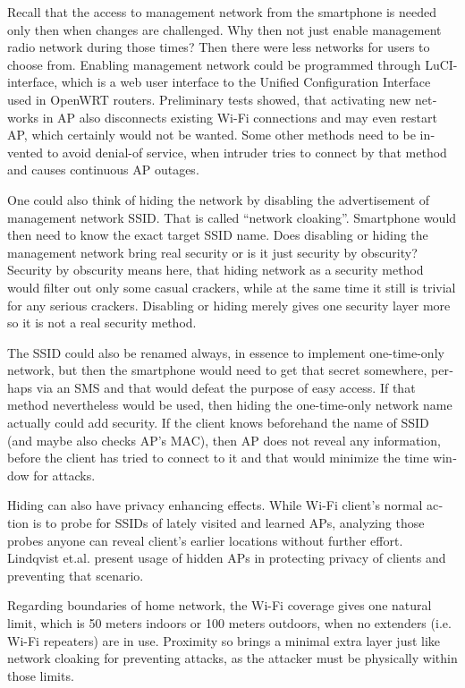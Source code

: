 \documentclass[12pt,a4paper,english]{tutthesis}
\begin{document}
\begin{otherlanguage}{english}
{Recall that the access to management network from the smartphone is
 needed only then when changes
are challenged. Why then not just enable management radio network
during those times? Then there were less networks for users to choose from.
Enabling management network could be programmed through 
LuCI-interface, which is a web user interface to the Unified
 Configuration Interface used in OpenWRT routers.
Preliminary tests showed, that activating new networks in AP also 
disconnects existing Wi-Fi connections and may even restart AP,
which certainly would not be wanted. Some other methods need to
be invented to avoid denial-of service, when intruder tries to 
connect by that method and causes continuous AP outages.

\label{tag:hidessid}
One could also think of hiding the network by disabling the
advertisement of management network SSID. That is called ``network
cloaking''.  Smartphone would then need to know the exact target SSID name.
Does disabling or hiding the management network bring real security or
is it just security by obscurity?  Security by obscurity means here,
that hiding network 
as a security method would filter out only some casual crackers, while
at the same time it still is trivial for any serious crackers.
Disabling or hiding  merely gives one security layer more so it is not
a real security method.

The SSID could also be renamed always, in essence to implement
one-time-only network, but then the smartphone would need to get that
secret somewhere, perhaps via an SMS and that would defeat the purpose
of easy access.  If that method nevertheless would be used, then
hiding the one-time-only network name actually could add security. 
If the client knows beforehand the name of SSID
(and maybe also checks AP's MAC), then AP does not reveal any information,
before the client has tried to connect to it and that would minimize
the time window for attacks.




 Hiding can also have privacy enhancing effects.
While Wi-Fi client's normal action is to probe for SSIDs of lately visited
and learned APs, analyzing those probes anyone can reveal client's earlier
locations without further effort.
Lindqvist et.al.\cite{hidden-wlan} present usage of hidden
APs in protecting privacy of clients and preventing that scenario.



Regarding boundaries of home network, the Wi-Fi coverage gives 
one natural limit, which is 50 meters indoors or 100 meters outdoors,
when no extenders (i.e. Wi-Fi repeaters) are in use.
Proximity so brings a minimal extra layer just like network cloaking 
for preventing attacks, as the attacker must be physically within those limits.


}
\end{otherlanguage}
\end{document}
